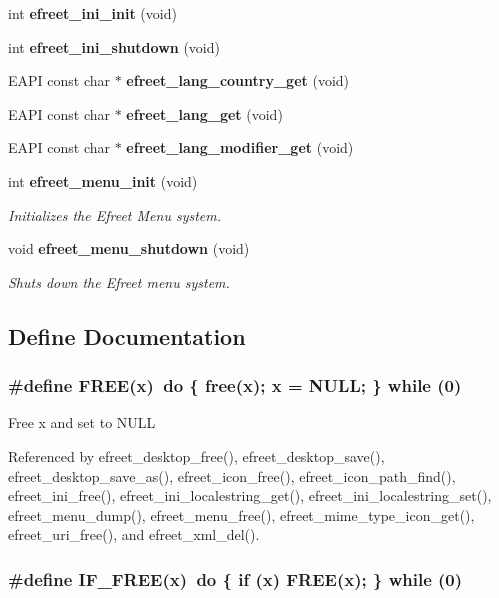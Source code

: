 \begin{CompactItemize}
int {\bf efreet\_\-ini\_\-init} (void)
\item 
int {\bf efreet\_\-ini\_\-shutdown} (void)
\item 
EAPI const char $\ast$ {\bf efreet\_\-lang\_\-country\_\-get} (void)
\item 
EAPI const char $\ast$ {\bf efreet\_\-lang\_\-get} (void)
\item 
EAPI const char $\ast$ {\bf efreet\_\-lang\_\-modifier\_\-get} (void)
\item 
int {\bf efreet\_\-menu\_\-init} (void)
\begin{CompactList}\small\item\em Initializes the Efreet Menu system. \item\end{CompactList}\item 
void {\bf efreet\_\-menu\_\-shutdown} (void)
\begin{CompactList}\small\item\em Shuts down the Efreet menu system. \item\end{CompactList}\end{CompactItemize}


\subsection{Define Documentation}
\subsubsection[FREE]{\setlength{\rightskip}{0pt plus 5cm}\#define FREE(x)~do \{ free(x); x = NULL; \} while (0)}\label{group__Efreet__Private_g25875003b43b81a4302256caa4a13599}


Free x and set to NULL 

Referenced by efreet\_\-desktop\_\-free(), efreet\_\-desktop\_\-save(), efreet\_\-desktop\_\-save\_\-as(), efreet\_\-icon\_\-free(), efreet\_\-icon\_\-path\_\-find(), efreet\_\-ini\_\-free(), efreet\_\-ini\_\-localestring\_\-get(), efreet\_\-ini\_\-localestring\_\-set(), efreet\_\-menu\_\-dump(), efreet\_\-menu\_\-free(), efreet\_\-mime\_\-type\_\-icon\_\-get(), efreet\_\-uri\_\-free(), and efreet\_\-xml\_\-del().
\subsubsection[IF\_\-FREE]{\setlength{\rightskip}{0pt plus 5cm}\#define IF\_\-FREE(x)~do \{ if (x) FREE(x); \} while (0)}\label{group__Efreet__Private_g3add950b6c67618ac81dfe4e8a69b576}


